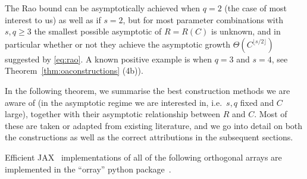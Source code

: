 \documentclass[11pt, letterpaper]{article}
\theoremstyle{definition}
\theoremstyle{remark}
\begin{document}
\begin{appendices}
The Rao bound can be asymptotically achieved when $q=2$ (the case of most interest to us) as well as if $s=2$, but for most parameter combinations with $s,q \ge 3$ the smallest possible asymptotic of $R = R(C)$ is unknown, and in particular whether or not they achieve the asymptotic growth $\Theta(C^{\lfloor s/2 \rfloor})$ suggested by \eqref{eq:rao}. A known positive example is when $q=3$ and $s=4$, see Theorem~\ref{thm:oaconstructions} (4b)).

In the following theorem, we summarise the best construction methods we are aware of (in the asymptotic regime we are interested in, i.e.\ $s,q$ fixed and $C$ large), together with their asymptotic relationship between $R$ and $C$. Most of these are taken or adapted from existing literature, and we go into detail on both the constructions as well as the correct attributions in the subsequent sections.

Efficient JAX~\cite{jax2018github} implementations of all of the following orthogonal arrays are implemented in the ``orray'' python package~\cite{orray}.


\end{appendices}
\end{document}
